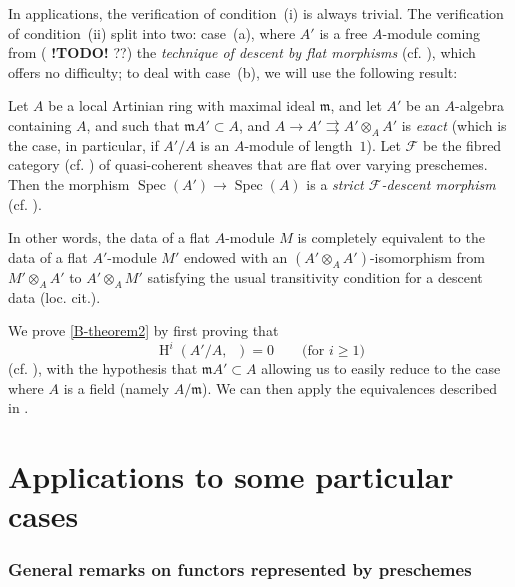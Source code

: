 \documentclass{article}
\theoremstyle{plain}
\newenvironment{theorem}[1]
  {\renewcommand\theinnercustomtheorem{#1}\innercustomtheorem}
  {\endinnercustomtheorem}
\theoremstyle{definition}
\newcommand{\cat}[1]{{\mathcal{#1}}}
\newcommand{\fk}[1]{{\mathfrak{#1}}}
\renewcommand{\geq}{\geqslant}
\DeclareMathOperator{\HH}{H}
\DeclareMathOperator{\Ga}{G_a}
\DeclareMathOperator{\Spec}{Spec}
\newcommand{\todo}{\textbf{ !TODO! }}
\begin{document}
In applications, the verification of condition~(i) is always trivial.
The verification of condition~(ii) split into two: case~(a), where $A'$ is a free $A$-module coming from (\todo??) the \emph{technique of descent by flat morphisms} (cf. \cite[Theorems~1, 2, and 3]{3}), which offers no difficulty;
to deal with case~(b), we will use the following result:

\begin{theorem}{2}
  \label{B-theorem2}
  Let $A$ be a local Artinian ring with maximal ideal $\fk{m}$, and let $A'$ be an $A$-algebra containing $A$, and such that $\fk{m}A'\subset A$, and $A\to A'\rightrightarrows A'\otimes_A A'$ is \emph{exact} (which is the case, in particular, if $A'/A$ is an $A$-module of length~$1$).
  Let $\cat{F}$ be the fibred category (cf. \cite[A, Definition~1.1]{3}) of quasi-coherent sheaves that are flat over varying preschemes.
  Then the morphism $\Spec(A')\to\Spec(A)$ is a \emph{strict $\cat{F}$-descent morphism} (cf. \cite[A, Definition~1.7]{3}).
\end{theorem}

In other words, the data of a flat $A$-module $M$ is completely equivalent to the data of a flat $A'$-module $M'$ endowed with an $(A'\otimes_A A')$-isomorphism from $M'\otimes_A A'$ to $A'\otimes_A M'$ satisfying the usual transitivity condition for a descent data (loc. cit.).

We prove \cref{B-theorem2} by first proving that
\[
  \HH^i(A'/A,\Ga) = 0
  \qquad\mbox{(for $i\geq1$)}
\]
(cf. \cite[A, \S4.e]{3}), with the hypothesis that $\fk{m}A'\subset A$ allowing us to easily reduce to the case where $A$ is a field (namely $A/\fk{m}$).
We can then apply the equivalences described in \cite[p.~16]{3}.


\part{Applications to some particular cases}
\label{C}


\section{General remarks on functors represented by preschemes}
\label{C.1}
\end{document}
